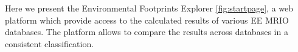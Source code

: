 Here we present the Environmental Footprints Explorer \ref{fig:startpage}, a web platform which provide access to the calculated results of
various EE MRIO databases. The platform allows to compare the results across
databases in a consistent classification. 